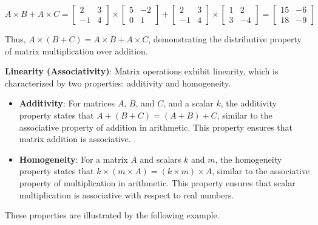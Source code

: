 \documentclass{report}
\begin{document}
\begin{tcolorbox}[colback=gray!10, boxrule=0pt]
\[
A \times B + A \times C = 
\begin{bmatrix}
2 & 3 \\
-1 & 4
\end{bmatrix}
\times
\begin{bmatrix}
5 & -2 \\
0 & 1
\end{bmatrix}
+
\begin{bmatrix}
2 & 3 \\
-1 & 4
\end{bmatrix}
\times
\begin{bmatrix}
1 & 2 \\
3 & -4
\end{bmatrix}
=
\begin{bmatrix}
15 & -6 \\
18 & -9
\end{bmatrix}
\]

Thus, \( A \times (B + C) = A \times B + A \times C \), demonstrating the distributive property of matrix multiplication over addition.
\end{tcolorbox}




\noindent \textbf{Linearity (Associativity)}:
Matrix operations exhibit linearity, which is characterized by two properties: additivity and homogeneity. 

\begin{itemize}
    \item \textbf{Additivity}: For matrices \( A \), \( B \), and \( C \), and a scalar \( k \), the additivity property states that \( A + (B + C) = (A + B) + C \), similar to the associative property of addition in arithmetic. This property ensures that matrix addition is associative.
    
    \item \textbf{Homogeneity}: For a matrix \( A \) and scalars \( k \) and \( m \), the homogeneity property states that \( k \times (m \times A) = (k \times m) \times A \), similar to the associative property of multiplication in arithmetic. This property ensures that scalar multiplication is associative with respect to real numbers.
\end{itemize}

These properties are illustrated by the following example.\\
\end{document}
